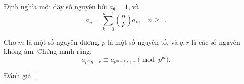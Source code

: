 \ifshowproblem
\begin{problem}\label{problem:ROU-2015-TST-D5-P3}
    Định nghĩa một dãy số nguyên bởi \( a_0 = 1 \), và 
    \[
        a_n = \sum_{k=0}^{n-1} \binom{n}{k} a_k, \quad n \geq 1.
    \]

    Cho \( m \) là một số nguyên dương, \( p \) là một số nguyên tố, và \( q, r \) là các số nguyên không âm.  
    Chứng minh rằng:
    \[
        a_{p^m q + r} \equiv a_{p^{m-1} q + r} \pmod{p^m}.
    \]
\end{problem}
\fi

\ifshowinfo
Đánh giá [\textbf{}]\footnotemark
{}
\fi